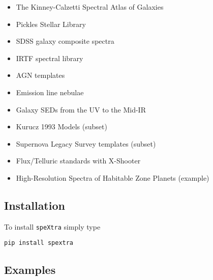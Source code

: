 \begin{itemize}

\item The Kinney-Calzetti Spectral Atlas of Galaxies

\item Pickles Stellar Library

\item SDSS galaxy composite spectra

\item IRTF spectral library

\item AGN templates

\item Emission line nebulae

\item Galaxy SEDs from the UV to the Mid-IR

\item Kurucz 1993 Models (subset)

\item Supernova Legacy Survey templates (subset)

\item Flux/Telluric standards with X-Shooter

\item High-Resolution Spectra of Habitable Zone Planets (example)


\end{itemize}



\subsection{Installation}

To install \texttt{speXtra} simply type

\texttt{pip install spextra}

 


\subsection{Examples%
  \label{examples}%
}
